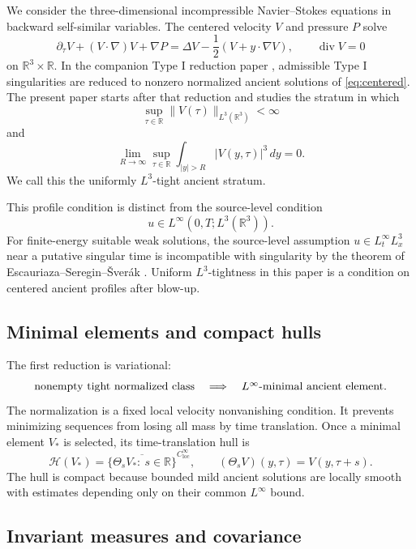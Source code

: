 \documentclass[11pt]{amsart}
\theoremstyle{plain}
\theoremstyle{definition}
\theoremstyle{remark}
\numberwithin{equation}{section}
\newcommand{\R}{\mathbb R}
\newcommand{\loc}{\mathrm{loc}}
\newcommand{\divergence}{\operatorname{div}}
\newcommand{\calH}{\mathcal H}
\begin{document}
We consider the three-dimensional incompressible Navier--Stokes equations in
backward self-similar variables.  The centered velocity \(V\) and pressure \(P\)
solve
\begin{equation}\label{eq:centered}
   \partial_\tau V+(V\cdot\nabla)V+\nabla P
   =
   \Delta V-\frac12(V+y\cdot\nabla V),
   \qquad \divergence V=0
\end{equation}
on \(\R^3\times\R\).  In the companion Type I reduction paper
\cite{DuranPaperI}, admissible Type I singularities are reduced to nonzero
normalized ancient solutions of \eqref{eq:centered}.  The present paper starts
after that reduction and studies the stratum in which
\begin{equation}\label{eq:L3-bound}
   \sup_{\tau\in\R}\|V(\tau)\|_{L^3(\R^3)}<\infty
\end{equation}
and
\begin{equation}\label{eq:L3-tightness}
   \lim_{R\to\infty}
   \sup_{\tau\in\R}\int_{|y|>R}|V(y,\tau)|^3\,dy=0 .
\end{equation}
We call this the uniformly \(L^3\)-tight ancient stratum.

This profile condition is distinct from the source-level condition
\[
   u\in L^\infty(0,T;L^3(\R^3)).
\]
For finite-energy suitable weak solutions, the source-level assumption
\(u\in L^\infty_tL^3_x\) near a putative singular time is incompatible with
singularity by the theorem of Escauriaza--Seregin--\v{S}ver\'ak
\cite{ESS2003}.  Uniform \(L^3\)-tightness in this paper is a condition on
centered ancient profiles after blow-up.

\subsection{Minimal elements and compact hulls}

The first reduction is variational:
\[
   \hbox{nonempty tight normalized class}
   \quad\Longrightarrow\quad
   \hbox{\(L^\infty\)-minimal ancient element}.
\]
The normalization is a fixed local velocity nonvanishing condition.  It
prevents minimizing sequences from losing all mass by time translation.
Once a minimal element \(V_*\) is selected, its time-translation hull is
\[
   \calH(V_*)
   =
   \overline{\{\Theta_sV_*:\ s\in\R\}}^{C^\infty_{\loc}},
   \qquad
   (\Theta_sV)(y,\tau)=V(y,\tau+s).
\]
The hull is compact because bounded mild ancient solutions are locally smooth
with estimates depending only on their common \(L^\infty\) bound.

\subsection{Invariant measures and covariance}
\end{document}
